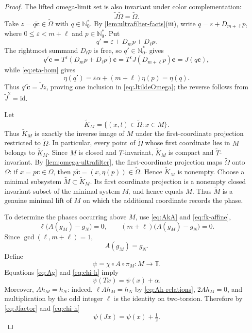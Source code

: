 \documentclass[reqno,12pt]{amsart}
\newcommand{\Nzero}{\mathbb N_0}
\newcommand{\Nstar}{\Nzero^{*}}
\newcommand{\Torus}{\mathbb T}
\numberwithin{equation}{section}
\begin{document}
\begin{proof}
The lifted omega-limit set is also invariant under color
complementation:
\begin{equation}\label{eq:JtildeOmega}
 \widetilde J\widetilde\Omega=\widetilde\Omega.
\end{equation}
Take $z=q\widetilde{\mathbf c}\in\widetilde\Omega$ with $q\in\Nstar$.
By \cref{lem:ultrafilter-facts}(iii), write
$q=\varepsilon+D_{m+\ell} p$, where $0\le\varepsilon<m+\ell$ and $p\in\Nstar$. Put
\[
 q'=\varepsilon+D_m p+D_\ell p.
\]
The rightmost summand $D_\ell p$ is free, so $q'\in\Nstar$.
 gives
\[
 q'\mathbf c
 =T^\varepsilon(D_m p+D_\ell p)\mathbf c
 =T^\varepsilon J(D_{m+\ell} p)\mathbf c
 =J(q\mathbf c),
\]
while \eqref{eq:eta-hom} gives
\[
 \eta(q')=\varepsilon\alpha+(m+\ell)\eta(p)=\eta(q).
\]
Thus $q'\widetilde{\mathbf c}=\widetilde Jz$, proving one inclusion in
\eqref{eq:JtildeOmega}; the reverse follows from $\widetilde J^2=\mathrm{id}$.

Let
\[
 \widetilde K_M
 =\{(x,t)\in\widetilde\Omega:x\in M\}.
\]
Thus $\widetilde K_M$ is exactly the inverse image of $M$ under the
first-coordinate projection restricted to $\widetilde\Omega$. In
particular, every point of $\widetilde\Omega$ whose first coordinate lies
in $M$ belongs to $\widetilde K_M$. Since $M$ is closed and $T$-invariant,
$\widetilde K_M$ is compact and $\widetilde T$-invariant.
By \cref{lem:omega-ultrafilter}, the first-coordinate projection maps
$\widetilde\Omega$ onto $\Omega$: if $x=p\mathbf c\in\Omega$, then
$p\widetilde{\mathbf c}=(x,\eta(p))\in\widetilde\Omega$. Hence
$\widetilde K_M$ is nonempty.
Choose a minimal subsystem $\widetilde M\subset\widetilde K_M$. Its first
coordinate projection is a nonempty closed invariant subset of the minimal
system $M$, and hence equals $M$.  Thus $\widetilde M$ is a genuine
minimal lift of $M$ on which the additional coordinate records the phase.

To determine the phases occurring above $M$, use
\eqref{eq:AkA} and
\eqref{eq:fk-affine},
\[
 \ell\bigl(A(g_M)-g_N\bigr)=0,
 \qquad
 (m+\ell)\bigl(A(g_M)-g_N\bigr)=0.
\]
Since $\gcd(\ell,m+\ell)=1$,
\begin{equation}\label{eq:Ag}
 A(g_M)=g_N.
\end{equation}
Define
\[
 \psi=\chi\circ A\circ\pi_M:M\to\Torus.
\]
Equations \eqref{eq:Ag} and \eqref{eq:chi-h} imply
\begin{equation}\label{eq:psi-dynamics}
 \psi(Tx)=\psi(x)+\alpha.
\end{equation}
Moreover, $Ah_M=h_N$: indeed, $\ell Ah_M=h_N$ by
\eqref{eq:Ah-relations}, $2Ah_M=0$, and multiplication by the odd integer
$\ell$ is the identity on two-torsion. Therefore by \eqref{eq:Jfactor} and \eqref{eq:chi-h} 
\begin{equation}\label{eq:psi-J}
 \psi(Jx)=\psi(x)+\tfrac12.
\end{equation}


\end{proof}
\end{document}
